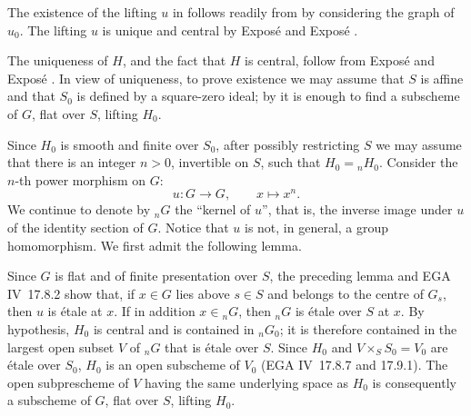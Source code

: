 
The existence of the lifting \(u\) in  follows
readily from  by considering the graph of \(u_0\). The
lifting \(u\) is unique and central by Exposé  and Exposé .

The uniqueness of \(H\), and the fact that \(H\) is central, follow
from Exposé  and Exposé . In view of uniqueness, to
prove existence we may assume that \(S\) is affine and that \(S_0\) is
defined by a square-zero ideal; by  it is enough to find
a subscheme of \(G\), flat over \(S\), lifting \(H_0\).

Since \(H_0\) is smooth and finite over \(S_0\), after possibly
restricting \(S\) we may assume that there is an integer \(n>0\),
invertible on \(S\), such that \(H_0={}_nH_0\). Consider the \(n\)-th
power morphism on \(G\):
\[
  u:G\longrightarrow G,\qquad x\longmapsto x^n.
\]
We continue to denote by \({}_nG\) the ``kernel of \(u\)'', that is,
the inverse image under \(u\) of the identity section of \(G\).
Notice that \(u\) is not, in general, a group homomorphism. We first
admit the following lemma.


Since \(G\) is flat and of finite presentation over \(S\), the
preceding lemma and EGA IV~17.8.2 show that, if \(x\in G\) lies above
\(s\in S\) and belongs to the centre of \(G_s\), then \(u\) is étale
at \(x\). If in addition \(x\in {}_nG\), then \({}_nG\) is étale over
\(S\) at \(x\). By hypothesis, \(H_0\) is central and is contained in
\({}_nG_0\); it is therefore contained in the largest open subset
\(V\) of \({}_nG\) that is étale over \(S\). Since \(H_0\) and
\(V\times_S S_0=V_0\) are étale over \(S_0\), \(H_0\) is an open
subscheme of \(V_0\) (EGA IV~17.8.7 and 17.9.1). The open subprescheme
of \(V\) having the same underlying space as \(H_0\) is consequently
a subscheme of \(G\), flat over \(S\), lifting \(H_0\).

